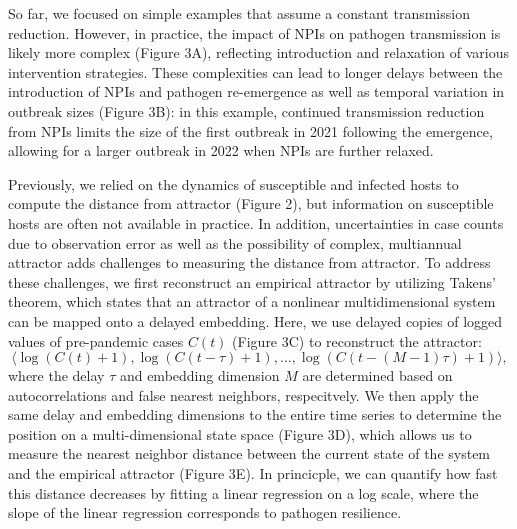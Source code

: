 \documentclass[12pt]{article}
\begin{document}
So far, we focused on simple examples that assume a constant transmission reduction.
However, in practice, the impact of NPIs on pathogen transmission is likely more complex (Figure 3A), reflecting introduction and relaxation of various intervention strategies.
These complexities can lead to longer delays between the introduction of NPIs and pathogen re-emergence as well as temporal variation in outbreak sizes (Figure 3B):
in this example, continued transmission reduction from NPIs limits the size of the first outbreak in 2021 following the emergence, allowing for a larger outbreak in 2022 when NPIs are further relaxed.

Previously, we relied on the dynamics of susceptible and infected hosts to compute the distance from attractor (Figure 2), but information on susceptible hosts are often not available in practice.
In addition, uncertainties in case counts due to observation error as well as the possibility of complex, multiannual attractor adds challenges to measuring the distance from attractor.
To address these challenges, we first reconstruct an empirical attractor by utilizing Takens' theorem, which states that an attractor of a nonlinear multidimensional system can be mapped onto a delayed embedding.
Here, we use delayed copies of logged values of pre-pandemic cases $C(t)$ (Figure 3C) to reconstruct the attractor:
\begin{equation}
\langle\log(C(t)+1), \log(C(t-\tau)+1), \dots, \log(C(t-(M-1)\tau)+1)\rangle,
\end{equation}
where the delay $\tau$ and embedding dimension $M$ are determined based on autocorrelations and false nearest neighbors, respecitvely.
We then apply the same delay and embedding dimensions to the entire time series to determine the position on a multi-dimensional state space (Figure 3D), which allows us to measure the nearest neighbor distance between the current state of the system and the empirical attractor (Figure 3E).
In princicple, we can quantify how fast this distance decreases by fitting a linear regression on a log scale, where the slope of the linear regression corresponds to pathogen resilience.
\end{document}
